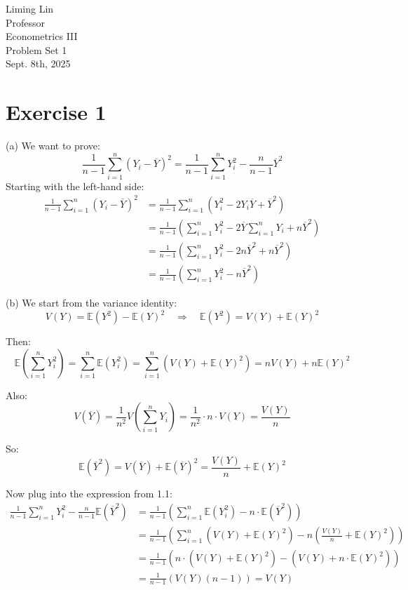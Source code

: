 \documentclass[12pt]{article}
\begin{document}
\begin{flushleft}
Liming Lin\\
Professor \\
Econometrics III\\
Problem Set 1\\
Sept. 8th, 2025\\
\section*{Exercise 1}
\item (a)
We want to prove:
\[
\frac{1}{n-1} \sum_{i=1}^n (Y_i - \overline{Y})^2 = \frac{1}{n-1} \sum_{i=1}^n Y_i^2 - \frac{n}{n-1} \overline{Y}^2
\]
Starting with the left-hand side:
\begin{align*}
\frac{1}{n-1} \sum_{i=1}^n (Y_i - \overline{Y})^2 
&= \frac{1}{n-1} \sum_{i=1}^n \left(Y_i^2 - 2Y_i\overline{Y} + \overline{Y}^2\right) \\
&= \frac{1}{n-1} \left( \sum_{i=1}^n Y_i^2 - 2\overline{Y} \sum_{i=1}^n Y_i + n\overline{Y}^2 \right) \\
&= \frac{1}{n-1} \left( \sum_{i=1}^n Y_i^2 - 2n\overline{Y}^2 + n\overline{Y}^2 \right) \\
&= \frac{1}{n-1} \left( \sum_{i=1}^n Y_i^2 - n\overline{Y}^2 \right)
\end{align*}

\item (b)
We start from the variance identity:
\[
V(Y) = \mathbb{E}(Y^2) - \mathbb{E}(Y)^2
\quad \Rightarrow \quad
\mathbb{E}(Y^2) = V(Y) + \mathbb{E}(Y)^2
\]

Then:
\[
\mathbb{E}\left(\sum_{i=1}^n Y_i^2\right)
= \sum_{i=1}^n \mathbb{E}(Y_i^2)
= \sum_{i=1}^n \left(V(Y) + \mathbb{E}(Y)^2\right)
= n V(Y) + n \mathbb{E}(Y)^2
\]

Also:
\[
V(\overline{Y}) = \frac{1}{n^2} V\left(\sum_{i=1}^n Y_i\right) 
= \frac{1}{n^2} \cdot n \cdot V(Y) 
= \frac{V(Y)}{n}
\]

So:
\[
\mathbb{E}(\overline{Y}^2) 
= V(\overline{Y}) + \mathbb{E}(\overline{Y})^2 
= \frac{V(Y)}{n} + \mathbb{E}(Y)^2
\]

Now plug into the expression from 1.1:
\begin{align*}
\frac{1}{n-1} \sum_{i=1}^n Y_i^2 
- \frac{n}{n-1} \mathbb{E}(\overline{Y}^2)
&= \frac{1}{n-1} \left( \sum_{i=1}^n \mathbb{E}(Y_i^2) - n \cdot \mathbb{E}(\overline{Y}^2) \right) \\
&= \frac{1}{n-1} \left( \sum_{i=1}^n \left(V(Y) + \mathbb{E}(Y)^2\right) - n \left( \frac{V(Y)}{n} + \mathbb{E}(Y)^2 \right) \right) \\
&= \frac{1}{n-1} \left( n \cdot \left(V(Y) + \mathbb{E}(Y)^2\right) - \left(V(Y) + n \cdot \mathbb{E}(Y)^2 \right) \right) \\
&= \frac{1}{n-1} \left( V(Y)(n - 1) \right) = V(Y)
\end{align*}

\end{flushleft}
\end{document}
